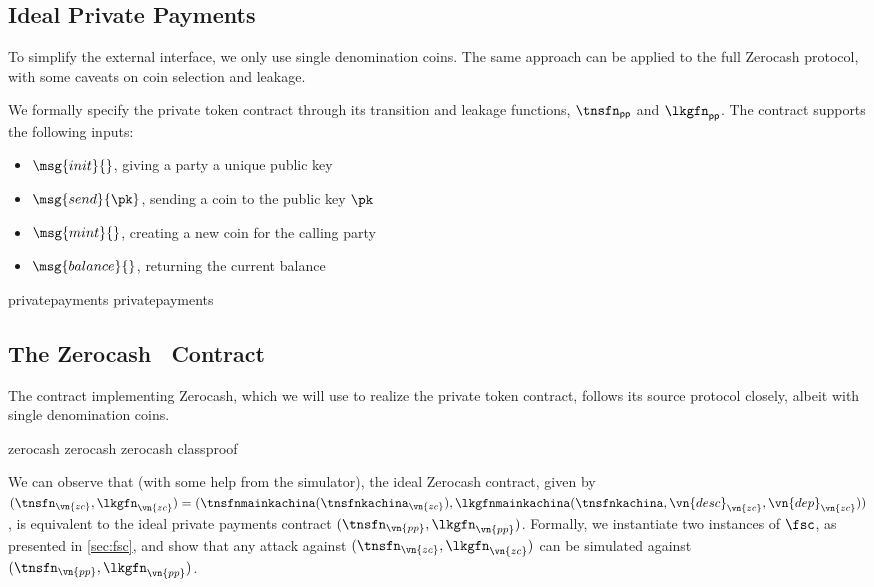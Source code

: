 \subsection{Ideal Private Payments}

To simplify the external interface, we only use single denomination coins. The
same approach can be applied to the full Zerocash protocol, with some caveats on
coin selection and leakage.

We formally specify the private token 
contract through its transition and leakage functions, $\tnsfn_{\mathsf{pp}}$
and $\lkgfn_{\mathsf{pp}}$. The contract supports the following inputs:
\begin{itemize}
  \item $\msg{init}{}$, giving a party a unique public key
  \item $\msg{send}{\pk}$, sending a coin to the public key $\pk$
  \item $\msg{mint}{}$, creating a new coin for the calling party
  \item $\msg{balance}{}$, returning the current balance
\end{itemize}

{privatepayments}
{privatepayments}

\subsection{The Zerocash \kachina\ Contract}
\label{app:zerocashkachina}

The contract implementing Zerocash, which we will use to realize the private
token contract, follows its source protocol closely, albeit with single
denomination coins.

{zerocash}
{zerocash}
{zerocash}
{classproof}

\sloppy We can observe that (with some help from the simulator), the ideal Zerocash
  contract, given by $(\tnsfn_\vn{zc}, \lkgfn_\vn{zc}) =\allowbreak
  (\tnsfnmainkachina(\tnsfnkachina_\vn{zc}),\allowbreak \lkgfnmainkachina(\tnsfnkachina,
  \vn{desc}_\vn{zc}, \vn{dep}_\vn{zc}))$, is equivalent to the ideal private
  payments contract $(\tnsfn_\vn{pp}, \lkgfn_\vn{pp})$. Formally, we instantiate
  two instances of $\fsc$, as presented in \autoref{sec:fsc}, and show that any
  attack against $(\tnsfn_\vn{zc}, \lkgfn_\vn{zc})$ can be simulated against
  $(\tnsfn_\vn{pp}, \lkgfn_\vn{pp})$.

